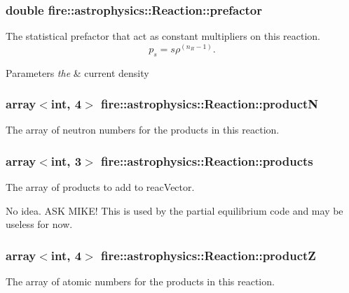 \subsubsection[{prefactor}]{\setlength{\rightskip}{0pt plus 5cm}double fire\+::astrophysics\+::\+Reaction\+::prefactor}\label{a00033_a5033228e6305beb4e8dd717d2f088d99}
The statistical prefactor that act as constant multipliers on this reaction. \[ p_s = s\rho^{(n_R -1)}. \] 
\begin{DoxyParams}{Parameters}
{\em the} & current density \\
\hline
\end{DoxyParams}
\hypertarget{a00033_a81251169f8dd972b6cdc285fbc42c331}{}
\subsubsection[{product\+N}]{\setlength{\rightskip}{0pt plus 5cm}array$<$int, 4$>$ fire\+::astrophysics\+::\+Reaction\+::product\+N}\label{a00033_a81251169f8dd972b6cdc285fbc42c331}
The array of neutron numbers for the products in this reaction. \hypertarget{a00033_a5d0e77ebec059081aaafa5ba86df4c88}{}
\subsubsection[{products}]{\setlength{\rightskip}{0pt plus 5cm}array$<$int, 3$>$ fire\+::astrophysics\+::\+Reaction\+::products}\label{a00033_a5d0e77ebec059081aaafa5ba86df4c88}
The array of products to add to reac\+Vector.

No idea. A\+S\+K M\+I\+K\+E! This is used by the partial equilibrium code and may be useless for now. \hypertarget{a00033_a0586d888e1f60d6371239af888f9158b}{}
\subsubsection[{product\+Z}]{\setlength{\rightskip}{0pt plus 5cm}array$<$int, 4$>$ fire\+::astrophysics\+::\+Reaction\+::product\+Z}\label{a00033_a0586d888e1f60d6371239af888f9158b}
The array of atomic numbers for the products in this reaction. \hypertarget{a00033_a343553d449e3cca261f8ee166fa6b699}{}

